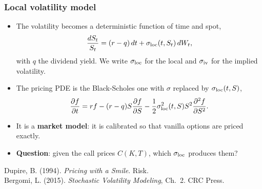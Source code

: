 
\begin{frame}
\frametitle{Local volatility model}
\begin{scriptsize}
\begin{itemize}
\item The volatility becomes a deterministic function of time and spot,
\begin{equation*}
    \frac{dS_t}{S_t} = (r - q)\, dt + \sigma_{\mathrm{loc}}(t, S_t)\, dW_t ,
\end{equation*}
with $q$ the dividend yield.
We write $\sigma_{\mathrm{loc}}$ for the local and $\sigma_{\mathrm{iv}}$ for the implied volatility.

\item The pricing PDE is the Black-Scholes one with $\sigma$ replaced by $\sigma_{\mathrm{loc}}(t,S)$,
\begin{equation*}
    \frac{\partial f}{\partial t} =
        r f
        - (r - q) S \frac{\partial f}{\partial S}
        - \frac{1}{2} \sigma_{\mathrm{loc}}^2(t, S) S^2 \frac{\partial^2 f}{\partial S^2}.
\end{equation*}

\item It is a \textbf{market model}: it is calibrated so that vanilla options are priced exactly.

\item \textbf{Question}: given the call prices $C(K,T)$, which $\sigma_{\mathrm{loc}}$ produces them?
\end{itemize}
\medskip
Dupire, B. (1994). \emph{Pricing with a Smile}. Risk.\\
Bergomi, L. (2015). \emph{Stochastic Volatility Modeling}, Ch.~2. CRC Press.
\end{scriptsize}
\end{frame}

